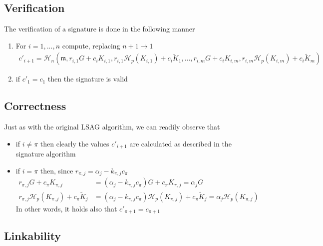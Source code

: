 \subsection*{Verification}

The verification of a signature is done in the following manner

\begin{enumerate}
	\item  For \(i = 1, ..., n\) compute, replacing \(n + 1 \rightarrow 1\)
	\begin{align*}
	c'_{i+1} = \mathcal{H}_n(\mathfrak{m}, r_{i, 1} G + c_i K_{i, 1}, r_{i, 1} \mathcal{H}_p(K_{i, 1}) + c_i \tilde{K}_1, 
	..., r_{i, m} G + c_i K_{i, m}, r_{i, m} \mathcal{H}_p(K_{i, m}) + c_i \tilde{K}_m) 
	\end{align*}
	
	\item if \(c'_1 = c_1\) then the signature is valid
\end{enumerate}


\subsection*{Correctness}

Just as with the original LSAG algorithm, we can readily observe that

\begin{itemize}

\item[] if \(i \ne \pi \) then clearly the values \(c'_{i + 1}\) are calculated as described in the signature algorithm

\item[] if \(i = \pi\) then, since \(r_{\pi, j} = \alpha_j -k_{\pi, j} c_\pi \)
\begin{align*}  
  r_{\pi, j} G + c_\pi K_{\pi,j}                              
                   &= (\alpha_j - k_{\pi, j} c_\pi) G + c_\pi K_{\pi, j}     
                   = \alpha_j G \\  
  r_{\pi, j} \mathcal{H}_p(K_{\pi, j}) + c_\pi \tilde{K}_j  
                   &= (\alpha_j - k_{\pi, j} c_\pi) \mathcal{H}_p(K_{\pi, j}) + c_\pi \tilde{K}_j 
                   = \alpha_j \mathcal{H}_p(K_{\pi, j}) 
\end{align*}
   In other words, it holds also that \(c'_{\pi + 1} = c_{\pi+1}\) 

\end{itemize}


\subsection*{Linkability}

